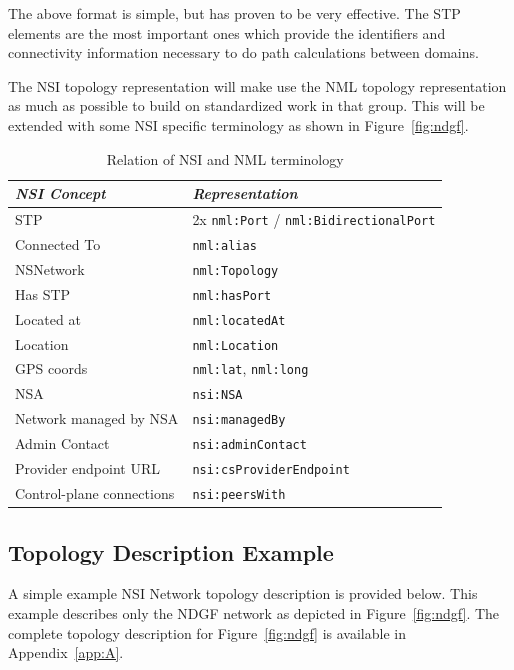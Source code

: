 \documentclass[12pt]{article}  %
\begin{document}
 The above format is simple, but has proven to be very effective. 
The STP elements are the most important ones which provide the identifiers and 
connectivity information necessary to do path calculations between domains.

 The NSI topology representation will make use the NML topology 
representation as much as possible to build on standardized work in that group. 
This will be extended with some NSI specific terminology as shown in Figure~\ref{fig:ndgf}.

\begin{table}
  \begin{center}

  \begin{tabular}{|l|l|}
\hline
\textit{NSI Concept} & \textit{Representation}\\
\hline
STP & 2x 
\texttt{nml:Port} / \texttt{nml:BidirectionalPort}\\
\hline
Connected To & \texttt{nml:alias}\\
\hline
NSNetwork & \texttt{nml:Topology}\\
\hline
Has STP & \texttt{nml:hasPort}\\
\hline
Located at & \texttt{nml:locatedAt}\\
\hline
Location & \texttt{nml:Location}\\
\hline
GPS coords & \texttt{nml:lat}, 
\texttt{nml:long}\\
\hline
NSA & \texttt{nsi:NSA}\\
\hline
Network managed by NSA & \texttt{nsi:managedBy}\\
\hline
Admin Contact & \texttt{nsi:adminContact}\\
\hline
Provider endpoint URL & \texttt{nsi:csProviderEndpoint}\\
\hline
Control-plane connections & \texttt{nsi:peersWith}\\
\hline
\end{tabular}
\caption{Relation of NSI and NML terminology}\label{tab:nsi-nml}
  \end{center}
\end{table}


\subsection{Topology Description Example}

 A simple example NSI Network topology description is provided 
below. This example describes only the NDGF network as depicted in Figure~\ref{fig:ndgf}. The 
complete topology description for Figure~\ref{fig:ndgf} is available in Appendix~\ref{app:A}.
\end{document}
